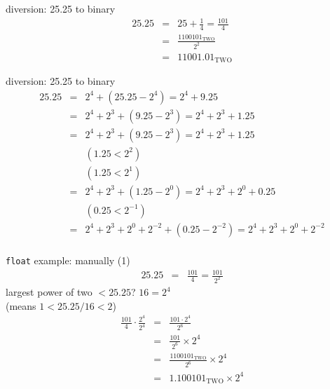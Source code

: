 \begin{frame}{diversion: 25.25 to binary}
\begin{eqnarray*}
    25.25 &=& 25+\frac{1}{4} = \frac{101}{4} \\
          &=& \frac{1100101_\text{TWO}}{2^2} \\
          &=& 11001.01_\text{TWO}
\end{eqnarray*}
\end{frame}

\begin{frame}{diversion: 25.25 to binary}
\begin{eqnarray*}
    25.25 &=& 2^4 + (25.25 - 2^4) = 2^4 + 9.25 \\
          &=& 2^4 + 2^3 + (9.25-2^3) = 2^4 + 2^3 + 1.25 \\
          &=& 2^4 + 2^3 + (9.25-2^3) = 2^4 + 2^3 + 1.25 \\
          &~& (1.25 < 2^2) \\
          &~& (1.25 < 2^1) \\
          &=& 2^4 + 2^3 + (1.25-2^0) = 2^4 + 2^3 + 2^0 + 0.25 \\
          &~& (0.25 < 2^{-1}) \\
          &=& 2^4 + 2^3 + 2^0 + 2^{-2} + (0.25 - 2^{-2}) = 2^4 + 2^3 + 2^0 + 2^{-2} \\
\end{eqnarray*}
\end{frame}


\begin{frame}{\texttt{float} example: manually (1)}
\begin{eqnarray*}
    25.25 &=& \frac{101}{4} = \frac{101}{2^2}
\end{eqnarray*}
largest power of two $<25.25$? $16=2^4$ \\
(means $1 < 25.25/16 < 2$)
\begin{eqnarray*}
    \frac{101}{4} \cdot \frac{2^4}{2^4} &=& \frac{101 \cdot 2^4}{2^6} \\
                &=& \frac{101}{2^6}\times 2^4 \\
                &=& \frac{1100101_\text{TWO}}{2^6}\times 2^4 \\
                &=& 1.100101_\text{TWO} \times 2^4
\end{eqnarray*}
\end{frame}

